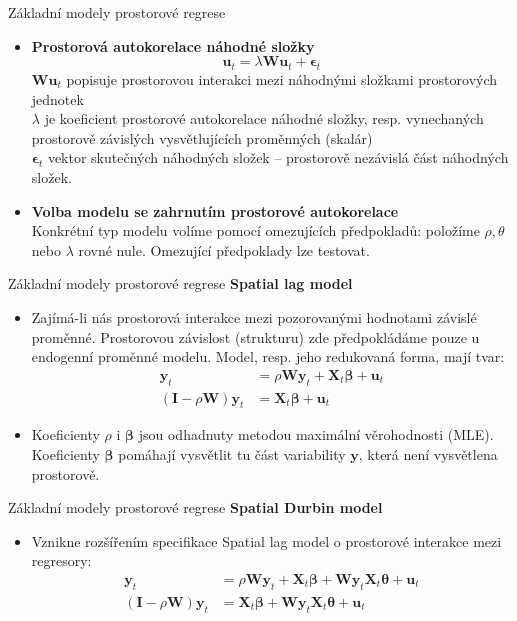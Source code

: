\documentclass{beamer}
\begin{document}
\begin{frame}{Základní modely prostorové regrese}
\begin{itemize}
	\item \textbf{Prostorová autokorelace náhodné složky} 
	$$\bm{u}_t = \lambda \bm{Wu}_t + \bm{\epsilon}_t$$
	 $\bm{Wu}_t$ popisuje prostorovou interakci mezi náhodnými složkami prostorových jednotek \\
	 $\lambda$ je koeficient prostorové autokorelace náhodné složky, resp. vynechaných prostorově  závislých vysvětlujících proměnných (skalár) \\
	 $\bm{\epsilon}_t$ vektor skutečných náhodných složek – prostorově nezávislá část náhodných složek.
	\item \textbf{Volba modelu se zahrnutím prostorové autokorelace} \\
		Konkrétní typ modelu volíme pomocí omezujících předpokladů: položíme $\rho,\theta$ nebo $\lambda$ rovné nule.
	Omezující předpoklady lze testovat. 
\end{itemize}
\end{frame}
\begin{frame}{Základní modely prostorové regrese}
\textbf{Spatial lag model}
\begin{itemize}
	\item Zajímá-li nás prostorová interakce mezi pozorovanými hodnotami závislé proměnné. Prostorovou závislost (strukturu) zde předpokládáme pouze u endogenní proměnné modelu. Model, resp. jeho redukovaná forma, mají tvar: 
	\begin{align*}
	\bm{y}_t & = \rho \bm{Wy}_t + \bm{X}_t\bm{\beta}+ \bm{u}_t\\
	(\bm{I} - \rho \bm{W}) \bm{y}_t & = \bm{X}_t \bm{\beta} + \bm{u}_t
	\end{align*}
	\item Koeficienty $\rho$ i $\bm{\beta}$ jsou odhadnuty metodou maximální věrohodnosti (MLE). Koeficienty  $\bm{\beta}$  pomáhají vysvětlit tu část variability $\bm{y}$, která není vysvětlena prostorově.	
\end{itemize}
\end{frame}
\begin{frame}{Základní modely prostorové regrese}
\textbf{Spatial Durbin model}
\begin{itemize}
	\item Vznikne rozšířením specifikace Spatial lag model o prostorové interakce mezi regresory: 
		\begin{align*}
		\bm{y}_t & = \rho \bm{Wy}_t + \bm{X}_t\bm{\beta}+ \bm{Wy}_t\bm{X}_t\bm{\theta} +  \bm{u}_t\\
		(\bm{I} - \rho \bm{W}) \bm{y}_t & = \bm{X}_t \bm{\beta} + \bm{Wy}_t\bm{X}_t\bm{\theta}+ \bm{u}_t
		\end{align*}
\end{itemize}
\end{frame}
\end{document}
